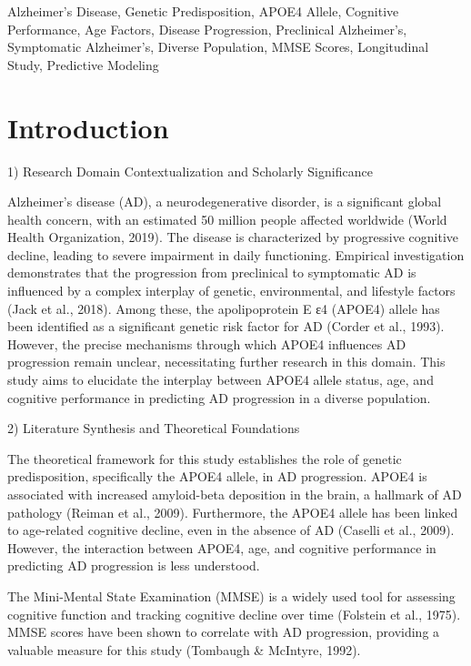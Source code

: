 \documentclass[conference]{IEEEtran}
\begin{document}
\begin{IEEEkeywords}
Alzheimer's Disease, Genetic Predisposition, APOE4 Allele, Cognitive Performance, Age Factors, Disease Progression, Preclinical Alzheimer's, Symptomatic Alzheimer's, Diverse Population, MMSE Scores, Longitudinal Study, Predictive Modeling
\end{IEEEkeywords}

\section{Introduction}
1) Research Domain Contextualization and Scholarly Significance

Alzheimer's disease (AD), a neurodegenerative disorder, is a significant global health concern, with an estimated 50 million people affected worldwide (World Health Organization, 2019). The disease is characterized by progressive cognitive decline, leading to severe impairment in daily functioning. Empirical investigation demonstrates that the progression from preclinical to symptomatic AD is influenced by a complex interplay of genetic, environmental, and lifestyle factors (Jack et al., 2018). Among these, the apolipoprotein E ε4 (APOE4) allele has been identified as a significant genetic risk factor for AD (Corder et al., 1993). However, the precise mechanisms through which APOE4 influences AD progression remain unclear, necessitating further research in this domain. This study aims to elucidate the interplay between APOE4 allele status, age, and cognitive performance in predicting AD progression in a diverse population.

2) Literature Synthesis and Theoretical Foundations

The theoretical framework for this study establishes the role of genetic predisposition, specifically the APOE4 allele, in AD progression. APOE4 is associated with increased amyloid-beta deposition in the brain, a hallmark of AD pathology (Reiman et al., 2009). Furthermore, the APOE4 allele has been linked to age-related cognitive decline, even in the absence of AD (Caselli et al., 2009). However, the interaction between APOE4, age, and cognitive performance in predicting AD progression is less understood. 

The Mini-Mental State Examination (MMSE) is a widely used tool for assessing cognitive function and tracking cognitive decline over time (Folstein et al., 1975). MMSE scores have been shown to correlate with AD progression, providing a valuable measure for this study (Tombaugh & McIntyre, 1992). 
\end{document}
